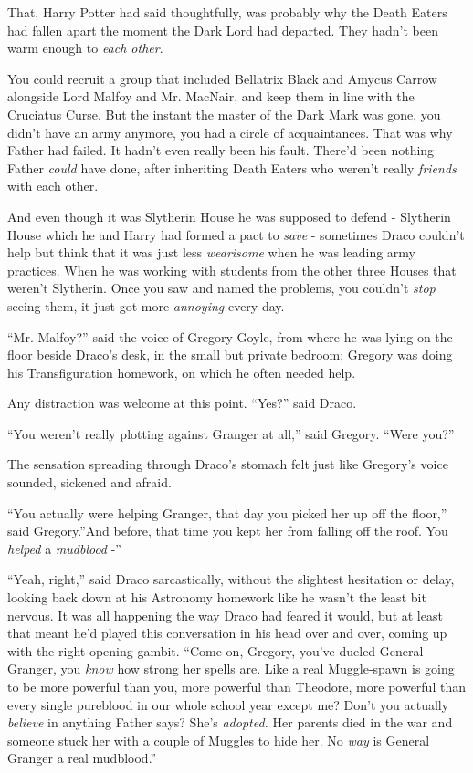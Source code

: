 That, Harry Potter had said thoughtfully, was probably why the Death
Eaters had fallen apart the moment the Dark Lord had departed. They
hadn't been warm enough to \emph{each other}.

You could recruit a group that included Bellatrix Black and Amycus
Carrow alongside Lord Malfoy and Mr. MacNair, and keep them in line with
the Cruciatus Curse. But the instant the master of the Dark Mark was
gone, you didn't have an army anymore, you had a circle of
acquaintances. That was why Father had failed. It hadn't even really
been his fault. There'd been nothing Father \emph{could} have done,
after inheriting Death Eaters who weren't really \emph{friends} with
each other.

And even though it was Slytherin House he was supposed to defend -
Slytherin House which he and Harry had formed a pact to \emph{save} -
sometimes Draco couldn't help but think that it was just less
\emph{wearisome} when he was leading army practices. When he was working
with students from the other three Houses that weren't Slytherin. Once
you saw and named the problems, you couldn't \emph{stop} seeing them, it
just got more \emph{annoying} every day.

``Mr. Malfoy?'' said the voice of Gregory Goyle, from where he was lying
on the floor beside Draco's desk, in the small but private bedroom;
Gregory was doing his Transfiguration homework, on which he often needed
help.

Any distraction was welcome at this point. ``Yes?'' said Draco.

``You weren't really plotting against Granger at all,'' said Gregory.
``Were you?''

The sensation spreading through Draco's stomach felt just like Gregory's
voice sounded, sickened and afraid.

``You actually were helping Granger, that day you picked her up off the
floor,'' said Gregory.''And before, that time you kept her from falling
off the roof. You \emph{helped} a \emph{mudblood} -''

``Yeah, right,'' said Draco sarcastically, without the slightest
hesitation or delay, looking back down at his Astronomy homework like he
wasn't the least bit nervous. It was all happening the way Draco had
feared it would, but at least that meant he'd played this conversation
in his head over and over, coming up with the right opening gambit.
``Come on, Gregory, you've dueled General Granger, you \emph{know} how
strong her spells are. Like a real Muggle-spawn is going to be more
powerful than you, more powerful than Theodore, more powerful than every
single pureblood in our whole school year except me? Don't you actually
\emph{believe} in anything Father says? She's \emph{adopted.} Her
parents died in the war and someone stuck her with a couple of Muggles
to hide her. No \emph{way} is General Granger a real mudblood.''

